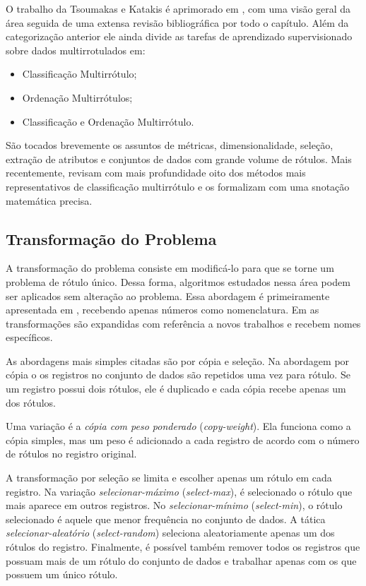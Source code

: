 \documentclass[runningheads,a4paper]{llncs}
\begin{document}
O trabalho da Tsoumakas e Katakis é aprimorado em \cite{Tsoumakas2009-vw}, com uma visão geral da área seguida de uma extensa revisão bibliográfica por todo o capítulo. Além da categorização anterior ele ainda divide as tarefas de aprendizado supervisionado sobre dados multirrotulados em:

\begin{itemize}
\item Classificação Multirrótulo;
\item Ordenação Multirrótulos;
\item Classificação e Ordenação Multirrótulo.
\end{itemize}

São tocados brevemente os assuntos de métricas, dimensionalidade, seleção, extração de atributos e conjuntos de dados com grande volume de rótulos. 
Mais recentemente, \cite{Zhang2014-be} revisam com mais profundidade oito dos métodos mais representativos de classificação multirrótulo e os formalizam com uma snotação matemática precisa.

\subsection{Transformação do Problema}\label{subsec:transformacao}

A transformação do problema consiste em modificá-lo para que se torne um problema de rótulo único. Dessa forma, algoritmos estudados nessa área podem ser aplicados sem alteração ao problema. Essa abordagem é primeiramente apresentada em \cite{Tsoumakas2007-cw}, recebendo apenas números como nomenclatura. Em \cite{Tsoumakas2009-vw} as transformações são expandidas com referência a novos trabalhos e recebem nomes específicos.

As abordagens mais simples citadas são por cópia e seleção. Na abordagem por cópia o os registros no conjunto de dados são repetidos uma vez para rótulo. Se um registro possui dois rótulos, ele é duplicado e cada cópia recebe apenas um dos rótulos.

Uma variação é a \emph{cópia com peso ponderado} (\textit{copy-weight}). Ela funciona como a cópia simples, mas um peso é adicionado a cada registro de acordo com o número de rótulos no registro original.

A transformação por seleção se limita e escolher apenas um rótulo em cada registro. Na variação \emph{selecionar-máximo} (\textit{select-max}), é selecionado o rótulo que mais aparece em outros registros. No \emph{selecionar-mínimo} (\textit{select-min}), o rótulo selecionado é aquele que menor frequência no conjunto de dados. A tática \emph{selecionar-aleatório} (\textit{select-random}) seleciona aleatoriamente apenas um dos rótulos do registro. Finalmente, é possível também remover todos os registros que possuam mais de um rótulo do conjunto de dados e trabalhar apenas com os que possuem um único rótulo.
\end{document}
